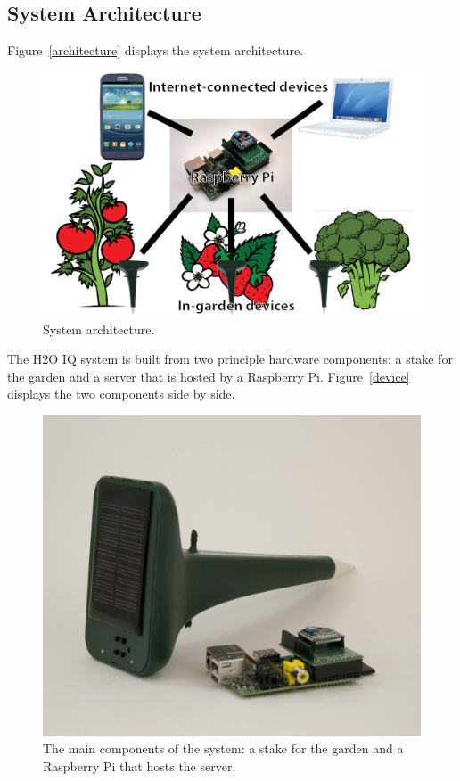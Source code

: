 \documentclass[11pt]{article}
\begin{document}
\subsection{System Architecture}

Figure~\ref{architecture} displays the system architecture.

\begin{figure}[h]
\begin{center}
\includegraphics[scale=0.7]{./pngs/architecture.png}
\end{center}
\caption{System architecture.}
\label{fig:architecture}
\end{figure}

The H2O IQ system is built from two principle hardware components: a stake for the garden and a server that is hosted by a Raspberry Pi. Figure~\ref{device} displays the two components side by side.

\begin{figure}[h]
\begin{center}
\includegraphics[scale=0.15]{./pngs/device.jpg}
\end{center}
\caption{The main components of the system: a stake for the garden and a Raspberry Pi that hosts the server.}
\label{fig:device}
\end{figure}
\end{document}
